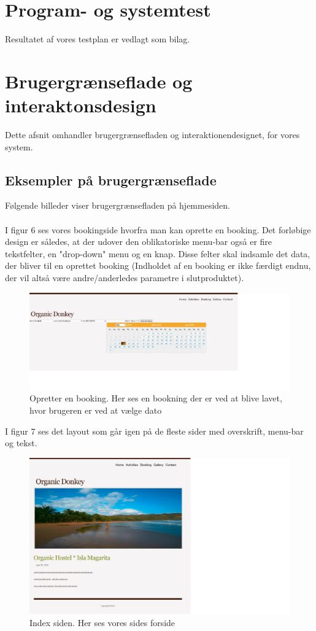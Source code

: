 \documentclass[12pt,a4paper]{article}
\begin{document}
\section{Program- og systemtest}
Resultatet af vores testplan er vedlagt som bilag.
\newpage
\section{Brugergrænseflade og interaktonsdesign}
Dette afsnit omhandler brugergrænsefladen og interaktionendesignet, for vores system. 
\subsection{Eksempler på brugergrænseflade}
Følgende billeder viser brugergrænsefladen på hjemmesiden.\\\\
I figur 6 ses vores bookingside hvorfra man kan oprette en booking. 
Det forløbige design er således, at der udover den oblikatoriske menu-bar 
også er fire tekstfelter, en "drop-down" menu og en knap.
Disse felter skal indsamle det data, der bliver til en oprettet booking 
(Indholdet af en booking er ikke færdigt endnu, 
der vil altså være andre/anderledes parametre i slutproduktet). 
\begin{figure}[H]
\centering
\includegraphics[scale=0.5] {brugergransefladebilled1.jpg}
\caption{Opretter en booking. Her ses en bookning der er ved at blive lavet, hvor brugeren er ved at vælge dato}
\end{figure}
\newpage
I figur 7 ses det layout som går igen på de fleste sider
 med overskrift, menu-bar og tekst.
\begin{figure}[H]
\centering
\includegraphics[scale=0.6] {brugergransefladebilled2.jpg}
\caption{Index siden. Her ses vores sides forside} 
\end{figure} 
\end{document}

